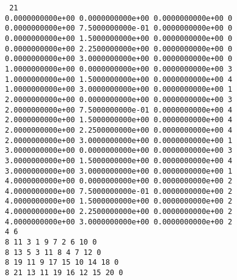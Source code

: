 \documentclass[12pt]{book}
\begin{document}
\noindent
{\tt
21\\
0.0000000000e+00 0.0000000000e+00 0.0000000000e+00 0\\
0.0000000000e+00 7.5000000000e-01 0.0000000000e+00 0\\
0.0000000000e+00 1.5000000000e+00 0.0000000000e+00 0\\
0.0000000000e+00 2.2500000000e+00 0.0000000000e+00 0\\
0.0000000000e+00 3.0000000000e+00 0.0000000000e+00 0\\
1.0000000000e+00 0.0000000000e+00 0.0000000000e+00 3\\
1.0000000000e+00 1.5000000000e+00 0.0000000000e+00 4\\
1.0000000000e+00 3.0000000000e+00 0.0000000000e+00 1\\
2.0000000000e+00 0.0000000000e+00 0.0000000000e+00 3\\
2.0000000000e+00 7.5000000000e-01 0.0000000000e+00 4\\
2.0000000000e+00 1.5000000000e+00 0.0000000000e+00 4\\
2.0000000000e+00 2.2500000000e+00 0.0000000000e+00 4\\
2.0000000000e+00 3.0000000000e+00 0.0000000000e+00 1\\
3.0000000000e+00 0.0000000000e+00 0.0000000000e+00 3\\
3.0000000000e+00 1.5000000000e+00 0.0000000000e+00 4\\
3.0000000000e+00 3.0000000000e+00 0.0000000000e+00 1\\
4.0000000000e+00 0.0000000000e+00 0.0000000000e+00 2\\
4.0000000000e+00 7.5000000000e-01 0.0000000000e+00 2\\
4.0000000000e+00 1.5000000000e+00 0.0000000000e+00 2\\
4.0000000000e+00 2.2500000000e+00 0.0000000000e+00 2\\
4.0000000000e+00 3.0000000000e+00 0.0000000000e+00 2\\
4 6\\
8 11 3 1 9 7 2 6 10 0\\
8 13 5 3 11 8 4 7 12 0\\
8 19 11 9 17 15 10 14 18 0\\
8 21 13 11 19 16 12 15 20 0\\
}

\end{document}
